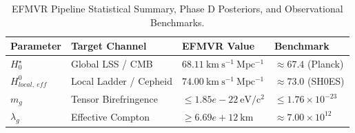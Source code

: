 \newcommand{\EFMVRHZeroStar}{68.11}
\newcommand{\EFMVRHZeroLocal}{74.00}
\newcommand{\EFMVRGravitonMass}{1.85e-22}
\newcommand{\EFMVRComptonWavelength}{6.69e+12}

\begin{table}[t]
\caption{EFMVR Pipeline Statistical Summary, Phase D Posteriors, 
and Observational Benchmarks.}
\label{tab:efmvr_metrics}
\centering
\begin{tabular}{llll}
\hline
Parameter & Target Channel & EFMVR Value & Benchmark \\
\hline
$H_0^\star$ & Global LSS / CMB & 
$\EFMVRHZeroStar\ \mathrm{km\ s^{-1}\ Mpc^{-1}}$ & 
$\approx 67.4$ (Planck) \\
$H_{local,\ e\!f\!f}^0$ & Local Ladder / Cepheid & 
$\EFMVRHZeroLocal\ \mathrm{km\ s^{-1}\ Mpc^{-1}}$ & 
$\approx 73.0$ (SH0ES) \\
$m_g$ & Tensor Birefringence & 
$\le \EFMVRGravitonMass\ \mathrm{eV/c^2}$ & 
$\le 1.76 \times 10^{-23}$ \\
$\lambda_g$ & Effective Compton & 
$\ge \EFMVRComptonWavelength\ \mathrm{km}$ & 
$\approx 7.00 \times 10^{12}$ \\
\hline
\end{tabular}
\end{table}
